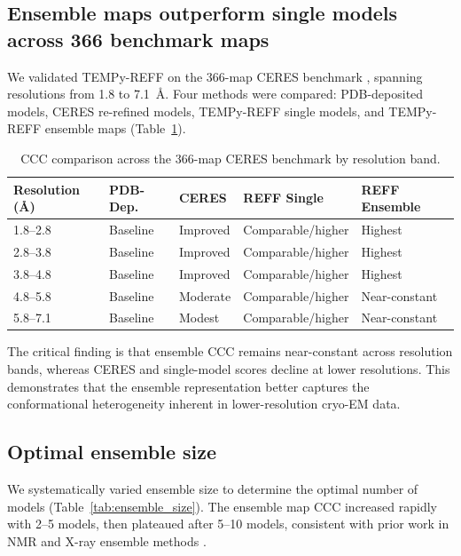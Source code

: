 \documentclass[11pt,a4paper]{article}
\begin{document}
\subsection{Ensemble maps outperform single models across 366 benchmark maps}

We validated TEMPy-REFF on the 366-map CERES benchmark \citep{Croll2022}, spanning resolutions from 1.8 to 7.1~\AA{}. Four methods were compared: PDB-deposited models, CERES re-refined models, TEMPy-REFF single models, and TEMPy-REFF ensemble maps (Table~\ref{tab:benchmark}).

\begin{table}[htbp]
\centering
\caption{CCC comparison across the 366-map CERES benchmark by resolution band.}
\label{tab:benchmark}
\small
\begin{tabular}{lllll}
\toprule
\textbf{Resolution (\AA)} & \textbf{PDB-Dep.} & \textbf{CERES} & \textbf{REFF Single} & \textbf{REFF Ensemble} \\
\midrule
1.8--2.8 & Baseline & Improved & Comparable/higher & Highest \\
2.8--3.8 & Baseline & Improved & Comparable/higher & Highest \\
3.8--4.8 & Baseline & Improved & Comparable/higher & Highest \\
4.8--5.8 & Baseline & Moderate & Comparable/higher & Near-constant \\
5.8--7.1 & Baseline & Modest & Comparable/higher & Near-constant \\
\bottomrule
\end{tabular}
\end{table}

The critical finding is that ensemble CCC remains near-constant across resolution bands, whereas CERES and single-model scores decline at lower resolutions. This demonstrates that the ensemble representation better captures the conformational heterogeneity inherent in lower-resolution cryo-EM data.

\subsection{Optimal ensemble size}

We systematically varied ensemble size to determine the optimal number of models (Table~\ref{tab:ensemble_size}). The ensemble map CCC increased rapidly with 2--5 models, then plateaued after 5--10 models, consistent with prior work in NMR and X-ray ensemble methods \citep{Burnley2012, Bonvin2005}.
\end{document}
